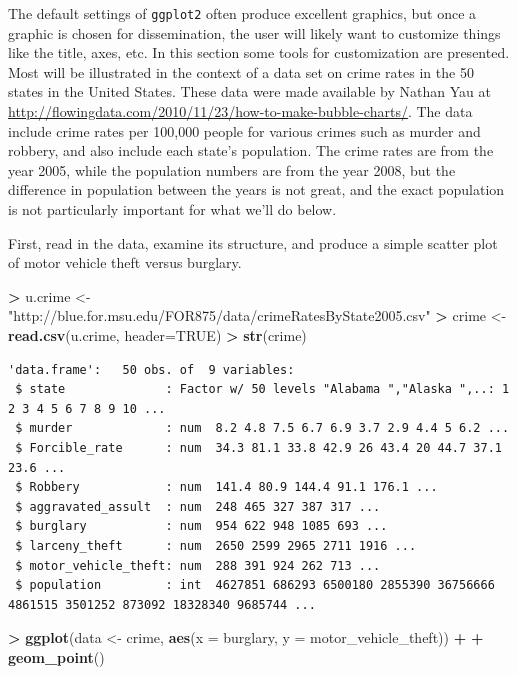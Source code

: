 \documentclass[]{krantz}
\makeatletter
\newenvironment{Shaded}{\begin{snugshade}}{\end{snugshade}}
\newcommand{\KeywordTok}[1]{\textcolor[rgb]{0.27,0.27,0.27}{\textbf{#1}}}
\newcommand{\DataTypeTok}[1]{\textcolor[rgb]{0.27,0.27,0.27}{#1}}
\newcommand{\StringTok}[1]{\textcolor[rgb]{0.5,0.5,0.5}{#1}}
\newcommand{\OtherTok}[1]{\textcolor[rgb]{0.37,0.37,0.37}{#1}}
\newcommand{\OperatorTok}[1]{\textcolor[rgb]{0.43,0.43,0.43}{\textbf{#1}}}
\newcommand{\NormalTok}[1]{#1}
\newenvironment{kframe}{%
\medskip{}
\setlength{\fboxsep}{.8em}
 \def\at@end@of@kframe{}%
 \ifinner\ifhmode%
  \def\at@end@of@kframe{\end{minipage}}%
  \begin{minipage}{\columnwidth}%
 \fi\fi%
 \def\FrameCommand##1{\hskip\@totalleftmargin \hskip-\fboxsep
 \colorbox{shadecolor}{##1}\hskip-\fboxsep
     \hskip-\linewidth \hskip-\@totalleftmargin \hskip\columnwidth}%
 \MakeFramed {\advance\hsize-\width
   \@totalleftmargin\z@ \linewidth\hsize
   \@setminipage}}%
 {\par\unskip\endMakeFramed%
 \at@end@of@kframe}
\renewenvironment{Shaded}{\begin{kframe}}{\end{kframe}}
\makeatother
\begin{document}
The default settings of \texttt{ggplot2} often produce excellent
graphics, but once a graphic is chosen for dissemination, the user will
likely want to customize things like the title, axes, etc. In this
section some tools for customization are presented. Most will be
illustrated in the context of a data set on crime rates in the 50 states
in the United States. These data were made available by Nathan Yau at
\url{http://flowingdata.com/2010/11/23/how-to-make-bubble-charts/}. The
data include crime rates per 100,000 people for various crimes such as
murder and robbery, and also include each state's population. The crime
rates are from the year 2005, while the population numbers are from the
year 2008, but the difference in population between the years is not
great, and the exact population is not particularly important for what
we'll do below.

First, read in the data, examine its structure, and produce a simple
scatter plot of motor vehicle theft versus burglary.

\begin{Shaded}
\begin{Highlighting}[]
\OperatorTok{>}\StringTok{ }\NormalTok{u.crime <-}\StringTok{ "http://blue.for.msu.edu/FOR875/data/crimeRatesByState2005.csv"}
\OperatorTok{>}\StringTok{ }\NormalTok{crime <-}\StringTok{ }\KeywordTok{read.csv}\NormalTok{(u.crime, }\DataTypeTok{header=}\OtherTok{TRUE}\NormalTok{)}
\OperatorTok{>}\StringTok{ }\KeywordTok{str}\NormalTok{(crime)}
\end{Highlighting}
\end{Shaded}

\begin{verbatim}
'data.frame':   50 obs. of  9 variables:
 $ state              : Factor w/ 50 levels "Alabama ","Alaska ",..: 1 2 3 4 5 6 7 8 9 10 ...
 $ murder             : num  8.2 4.8 7.5 6.7 6.9 3.7 2.9 4.4 5 6.2 ...
 $ Forcible_rate      : num  34.3 81.1 33.8 42.9 26 43.4 20 44.7 37.1 23.6 ...
 $ Robbery            : num  141.4 80.9 144.4 91.1 176.1 ...
 $ aggravated_assult  : num  248 465 327 387 317 ...
 $ burglary           : num  954 622 948 1085 693 ...
 $ larceny_theft      : num  2650 2599 2965 2711 1916 ...
 $ motor_vehicle_theft: num  288 391 924 262 713 ...
 $ population         : int  4627851 686293 6500180 2855390 36756666 4861515 3501252 873092 18328340 9685744 ...
\end{verbatim}

\begin{Shaded}
\begin{Highlighting}[]
\OperatorTok{>}\StringTok{ }\KeywordTok{ggplot}\NormalTok{(data <-}\StringTok{ }\NormalTok{crime, }\KeywordTok{aes}\NormalTok{(}\DataTypeTok{x =}\NormalTok{ burglary, }\DataTypeTok{y =}\NormalTok{ motor_vehicle_theft)) }\OperatorTok{+}\StringTok{ }
\OperatorTok{+}\StringTok{     }\KeywordTok{geom_point}\NormalTok{()}
\end{Highlighting}
\end{Shaded}
\end{document}
